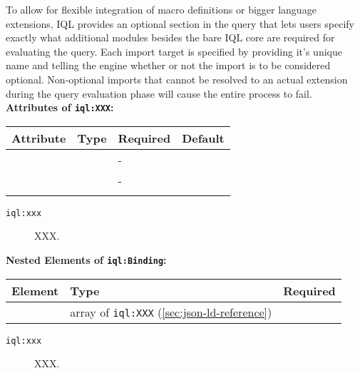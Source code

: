 \documentclass[11pt]{article}
\newcommand{\iql}{IQL\xspace}
\newcommand{\iqlns}{iql:}
\newcommand{\iqlType}[1]{\texttt{\iqlns#1}}
\newcommand{\attributes}[1]{\noindent\textbf{Attributes of \iqlType{#1}:}\newline\medskip}
\newcommand{\elements}[1]{\noindent\textbf{Nested Elements of \iqlType{#1}:}\newline\medskip}
\begin{document}
To allow for flexible integration of macro definitions or bigger language extensions, \iql provides an optional section in the query that lets users specify exactly what additional modules besides the bare \iql core are required for evaluating the query. 
Each import target is specified by providing it's unique name and telling the engine whether or not the import is to be considered optional.
Non-optional imports that cannot be resolved to an actual extension during the query evaluation phase will cause the entire process to fail.
\attributes{XXX}
\begin{tabular}{|p{}|p{}|p{}|p{}|}
	\hline
	\textbf{Attribute} & \textbf{Type} & \textbf{Required} & \textbf{Default} \\ 
	\hline
	\hline
	&  & - &  \\ 
	\hline 
	&  & - &  \\ 
	\hline 
	&  &  & \\ 
	\hline 
\end{tabular}
\begin{description}
	\item[\iqlType{xxx}] XXX.
\end{description}
\elements{Binding}
\begin{tabular}{|p{}|p{}|p{}|}
	\hline
	\textbf{Element} & \textbf{Type} & \textbf{Required} \\ 
	\hline
	\hline 
	& array of \iqlType{XXX} (\ref{sec:json-ld-reference}) &  \\ 
	\hline 
\end{tabular}
\begin{description}
	\item[\iqlType{xxx}] XXX.
\end{description}

\end{document}
